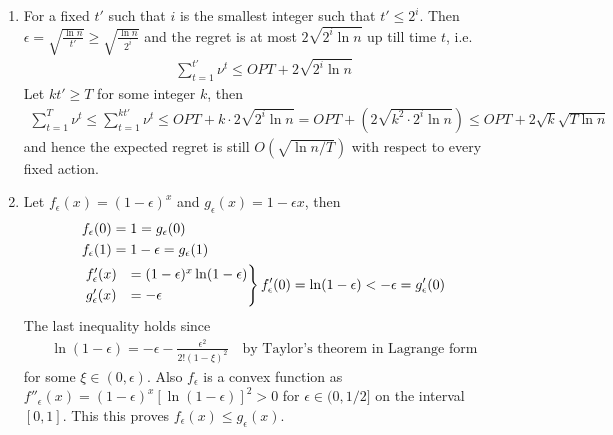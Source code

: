 \documentclass[a4paper,12pt]{article}
\theoremstyle{definition}
\begin{document}
\begin{enumerate}
\item For a fixed $t'$ such that $i$ is the smallest integer such that $t'\leq2^i$. Then $\epsilon=\sqrt{\frac{\ln n}{t'}}\geq\sqrt{\frac{\ln n}{2^i}}$ and the regret is at most $2\sqrt{2^i\ln n}$ up till time $t$, i.e.
\begin{align*}
\sum_{t=1}^{t'}\nu^t \leq OPT + 2\sqrt{2^i\ln n}
\end{align*}
Let $kt'\geq T$ for some integer $k$, then
\begin{align*}
\sum_{t=1}^{T}\nu^t \leq\sum_{t=1}^{kt'}\nu^t \leq OPT + k\cdot 2\sqrt{2^i\ln n}=OPT + (2\sqrt{k^2\cdot 2^i\ln n}) \leq OPT + 2\sqrt{k}\sqrt{T\ln n}
\end{align*}
and hence the expected regret is still $O(\sqrt{\ln n/T})$ with respect to every fixed action.
\item Let $f_\epsilon(x)=(1-\epsilon)^x$ and $g_\epsilon(x)=1-\epsilon x$, then
\begin{align*}
&f_\epsilon(0) = 1 = g_\epsilon(0)\\
&f_\epsilon(1) = 1-\epsilon = g_\epsilon(1)\\
&\begin{rcases}
 f'_\epsilon(x)&=(1-\epsilon)^x\ln (1-\epsilon) \\
  g'_\epsilon(x)&=-\epsilon \\
\end{rcases}f'_\epsilon(0) = \ln(1-\epsilon) < -\epsilon= g'_\epsilon(0)
\end{align*}
The last inequality holds since
\begin{align*}
\ln(1-\epsilon)=-\epsilon -\frac{\epsilon^2}{2!(1-\xi)^2}\quad \text{by Taylor's theorem in Lagrange form}
\end{align*}
for some $\xi \in (0,\epsilon)$. Also $f_\epsilon$ is a convex function as $f''_\epsilon(x)=(1-\epsilon)^x\left[\ln (1-\epsilon)\right]^2>0$ for $\epsilon \in(0,1/2]$ on the interval $[0,1]$. This this proves $f_\epsilon(x)\leq g_\epsilon(x)$.


\end{enumerate}
\end{document}
